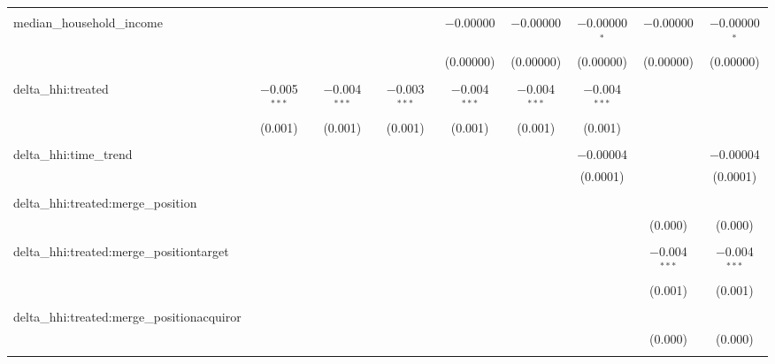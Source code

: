 \begin{table}[H]
{\begin{tabular}{@{\extracolsep{5pt}}lcccccccc}
   & & & & & & & & \\  

  median\_household\_income &  &  &  & $-$0.00000 & $-$0.00000 & $-$0.00000$^{*}$ & $-$0.00000 & $-$0.00000$^{*}$ \\  

   &  &  &  & (0.00000) & (0.00000) & (0.00000) & (0.00000) & (0.00000) \\  

   & & & & & & & & \\  

  delta\_hhi:treated & $-$0.005$^{***}$ & $-$0.004$^{***}$ & $-$0.003$^{***}$ & $-$0.004$^{***}$ & $-$0.004$^{***}$ & $-$0.004$^{***}$ &  &  \\  

   & (0.001) & (0.001) & (0.001) & (0.001) & (0.001) & (0.001) &  &  \\  

   & & & & & & & & \\  

  delta\_hhi:time\_trend &  &  &  &  &  & $-$0.00004 &  & $-$0.00004 \\  

   &  &  &  &  &  & (0.0001) &  & (0.0001) \\  

   & & & & & & & & \\  

  delta\_hhi:treated:merge\_position &  &  &  &  &  &  &  &  \\  

   &  &  &  &  &  &  & (0.000) & (0.000) \\  

   & & & & & & & & \\  

  delta\_hhi:treated:merge\_positiontarget &  &  &  &  &  &  & $-$0.004$^{***}$ & $-$0.004$^{***}$ \\  

   &  &  &  &  &  &  & (0.001) & (0.001) \\  

   & & & & & & & & \\  

  delta\_hhi:treated:merge\_positionacquiror &  &  &  &  &  &  &  &  \\  

   &  &  &  &  &  &  & (0.000) & (0.000) \\  

   & & & & & & & & \\  


\end{tabular}}
\end{table}
